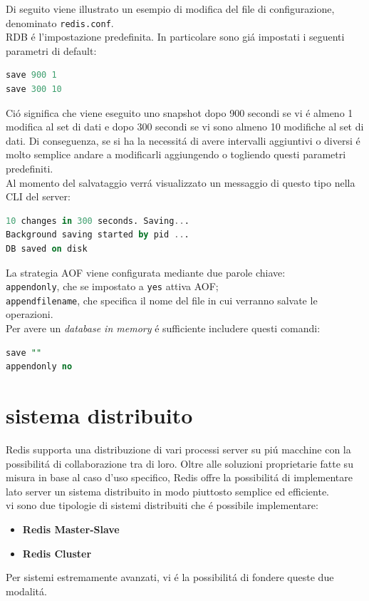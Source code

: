 Di seguito viene illustrato un esempio di modifica del file di configurazione, denominato \texttt{redis.conf}.\\

RDB é l'impostazione predefinita. In particolare sono giá impostati i seguenti parametri di default:
\begin{lstlisting}[autogobble, style=redis-cli, language=SQL]
save 900 1
save 300 10\end{lstlisting}
Ció significa che viene eseguito uno snapshot dopo 900 secondi se vi é almeno 1 modifica al set di dati e dopo
300 secondi se vi sono almeno 10 modifiche al set di dati.
Di conseguenza, se si ha la necessitá di avere intervalli aggiuntivi o diversi é molto semplice andare a modificarli aggiungendo o togliendo questi parametri predefiniti.\\

Al momento del salvataggio verrá visualizzato un messaggio di questo tipo nella CLI del server:
\begin{lstlisting}[autogobble, style=redis-cli, language=SQL]
10 changes in 300 seconds. Saving...
Background saving started by pid ...
DB saved on disk\end{lstlisting}


La strategia AOF viene configurata mediante due parole chiave:\\
\texttt{appendonly}, che se impostato a \texttt{yes} attiva AOF;\\
\texttt{appendfilename}, che specifica il nome del file in cui verranno salvate le operazioni.\\

Per avere un \emph{database in memory} é sufficiente includere questi comandi:
\begin{lstlisting}[autogobble, style=redis-cli, language=SQL]
save ""
appendonly no\end{lstlisting}



\section{sistema distribuito}
Redis supporta una distribuzione di vari processi server su piú macchine con la possibilitá di collaborazione tra di loro.
Oltre alle soluzioni proprietarie fatte su misura in base al caso d'uso specifico, Redis offre la possibilitá di implementare lato server un
sistema distribuito in modo piuttosto semplice ed efficiente.\\
vi sono due tipologie di sistemi distribuiti che é possibile implementare:
\begin{itemize}
    \item \textbf{Redis Master-Slave}
    \item \textbf{Redis Cluster}
\end{itemize}
Per sistemi estremamente avanzati, vi é la possibilitá di fondere queste due modalitá.
